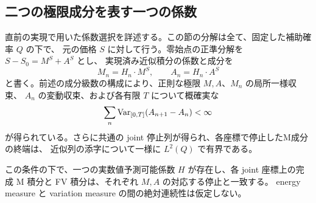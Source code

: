 \subsection{二つの極限成分を表す一つの係数}
\label{sec:joint-coefficient}
直前の実現で用いた係数選択を詳述する。この節の分解は全て、固定した補助確率 $Q$ の下で、
元の価格 $S$ に対して行う。零始点の正準分解を $S-S_0=M^S+A^S$ とし、
実現済み近似積分の係数と成分を
\[
 M_n=H_n\cdot M^S,\qquad A_n=H_n\cdot A^S
\]
と書く。前述の成分級数の構成により、正則な極限 $M,A$、$M_n$ の局所一様収束、
$A_n$ の変動収束、および各有限 $T$ について概確実な
\[
 \sum_n\operatorname{Var}_{[0,T]}(A_{n+1}-A_n)<\infty
\]
が得られている。さらに共通の joint 停止列が得られ、各座標で停止したM成分の終端は、
近似列の添字について一様に $L^2(Q)$ で有界である。

\begin{lemma}[二つの制御測度に対する同時係数選択]\label{lem:joint-coefficient}
この条件の下で、一つの実数値予測可能係数 $H$ が存在し、各 joint 座標上の完成 M 積分と
FV 積分は、それぞれ $M,A$ の対応する停止と一致する。
energy measure と variation measure の間の絶対連続性は仮定しない。
\end{lemma}
